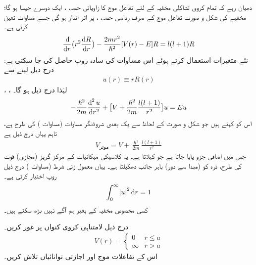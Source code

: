 دھیان رہے کہ تمام کروی تشاکلی  مخفیہ کے لئے تفاعل موج کا زاویائی حصہ، ،  ایک  دوسرے جیسا ہو گا؛ مخفیے 
 کی شکل و صورت تفاعل موج کے صرف رداسی حصہ، ، پر اثر انداز ہو گی جسے مساوات  تعین کرتی ہے۔
\begin{align}
\frac{\dif}{\dif r}\big(r^{2}\frac{\dif R}{\dif r}\big)-\frac{2mr^{2}}{\hslash^{2}}[V(r)-E]R=l(l+1)R
\end{align}
نئے متغیرات استعمال کرتے ہوئے اس مساوات کی سادہ روپ حاصل کی جا سکتی ہے: درج ذیل لینے سے
\begin{align}\label{مساوات_ابعادی_نئے_متغیر_رداسی}
u(r)\equiv{rR(r)} 
\end{align}  
، ،   لہٰذا درج ذیل ہو گا۔
\begin{align}\label{مساوات_ابعادی_رداسی}
-\frac{\hslash^{2}}{2m}\frac{\dif^{\,2}u}{\dif r^{2}}+\big[V+\frac{\hslash^{2}}{2m}\frac{l(l+1)}{r^{2}}\big]u=Eu
\end{align}
اس کو  کہتے ہیں جو شکل و صورت کے لحاظ سے یک بعدی شروڈنگر مساوات (مساوات ) کی طرح ہے، تاہم یہاں  درج ذیل ہے
\begin{align}
V_{\text{موثر}}=V+\frac{\hslash^{2}}{2m}\frac{l(l+1)}{r^{2}} 
\end{align}
 جس میں   اضافی جزو پایا جاتا ہے جو  کہلاتا ہے۔ یہ کلاسیکی میکانیات کے مرکز گریز (مجازی) قوت کی طرح، ذرہ کو (مبدا سے دور) باہر جانب دھکیلتا ہے۔ یہاں معمول زنی شرط (مساوات ) درج ذیل روپ اختیار کرتی ہے۔ 
\begin{align}
\int_{0}^{\infty}\abs{u}^{2}\dif r=1 
\end{align}
کسی مخصوص مخفیہ    کے بغیر ہم آگے نہیں بڑھ سکتے ہیں۔

درج ذیل لامتناہی کروی کنواں پر غور کریں۔
\begin{align}
V(r)=\begin{cases}
0&r\le {a}\\
\infty&r>a
\end{cases} 
\end{align}
اس کے تفاعلات موج اور اجازتی توانائیاں تلاش کریں۔

